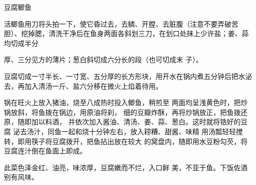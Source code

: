 \begin{recipe}{豆腐鲫鱼}

\ingredients



\cooking

\step 活鲫鱼用刀将头拍一下，使它昏过去，去鳞、开膛、去脏腹（注意不要弄破苦胆）、挖掉腮，清洗干净后在鱼身两面各斜划三刀，在划口处抹上少许盐；姜、蒜均切成半分

厚、三分见方的薄片；葱白斜切成六分长的段（也可切成末 子）。

\step 豆腐切成一寸半长、一寸宽、五分厚的长方形块，用开水在锅内煮五分钟后把水泌去，再加入清汤一斤、盐六分移在微火上焰着待用。

锅在旺火上放入猪油，烧至八成热时投入鲫鱼，稍煎至 两面均呈浅黄色时，把炒锅放斜，将鱼拨在锅边，用原油将刹， 细的豆瓣炸酥，再将炒锅放正，把鱼拨还原，随即加以料酒， 并依次加入酱油、清汤、姜、蒜、葱白。这时就将锆好的豆腐 泌去汤汁，同鱼一起和烧十分钟左右，放入耢糟、甜酱、味精 用汤瓢轻轻搅转，即用筷子将豆腐拨开，把鱼拈出放在较大 的窝盘内，随即用水豆粉勾芡，将豆腐连汁倒在鱼面上即成。

\notes

此菜色泽金红、油亮，味浓厚，豆腐嫩而不烂，入口鲜 美，不亚于鱼。下饭佐酒别有风味。

\end{recipe}

